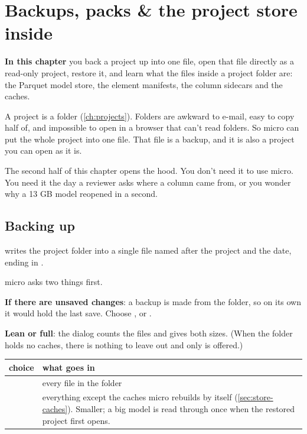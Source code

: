 \chapter{Backups, packs \& the project store inside}\label{ch:store}
\begin{goals}
\textbf{In this chapter} you back a project up into one file, open that file directly as a read-only project, restore it, and learn what the files inside a project folder are: the Parquet model store, the element manifests, the column sidecars and the caches.
\end{goals}

A project is a folder (\cref{ch:projects}). Folders are awkward to e-mail, easy to copy half of, and impossible to open in a browser that can't read folders. So micro can put the whole project into one file. That file is a backup, and it is also a project you can open as it is.

The second half of this chapter opens the hood. You don't need it to use micro. You need it the day a reviewer asks where a column came from, or you wonder why a 13 GB model reopened in a second.

\section{Backing up}\label{sec:store-backup}
 writes the project folder into a single file named after the project and the date, ending in .

micro asks two things first.

\textbf{If there are unsaved changes}: a backup is made from the folder, so on its own it would hold the last save. Choose , or .

\textbf{Lean or full}: the dialog counts the files and gives both sizes. (When the folder holds no caches, there is nothing to leave out and only  is offered.)

\begin{tabularx}{\linewidth}{@{}lL@{}}\toprule
choice & what goes in \\ \midrule
{} & every file in the folder \\
 & everything except the caches micro rebuilds by itself (\cref{sec:store-caches}). Smaller; a big model is read through once when the restored project first opens. \\
\bottomrule
\end{tabularx}

